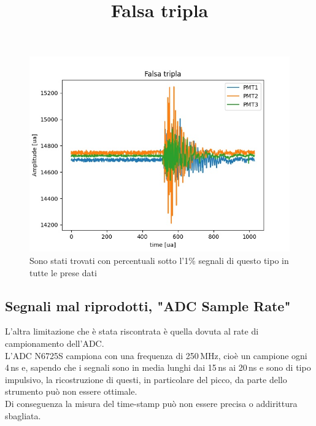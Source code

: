 \documentclass[a4paper,twocolumn]{article}
\begin{document}
\begin{figure}
\centering
\title{Falsa tripla}
\begin{center}
\includegraphics[scale=0.4]{./immagini/TimeOfFlight/FalsaTripla.jpg}
\caption{Sono stati trovati con percentuali sotto l'1$\%$ segnali di questo tipo in tutte le prese dati}
\label{fig:FalsaTripla}
\end{center}
\end{figure}

\subsection{Segnali mal riprodotti, "ADC Sample Rate"}
\label{sec:ATentativi}
L'altra limitazione che è stata riscontrata è quella dovuta al rate di campionamento dell'ADC.\\
L'ADC N6725S campiona con una frequenza di 250\,MHz, cioè un campione ogni 4\,ns e, sapendo che i segnali sono in media lunghi dai 15\,ns ai 20\,ns e sono di tipo impulsivo, la ricostruzione di questi, in particolare del picco, da parte dello strumento può non essere ottimale.\\
Di conseguenza la misura del time-stamp può non essere precisa o addirittura sbagliata.
\end{document}
